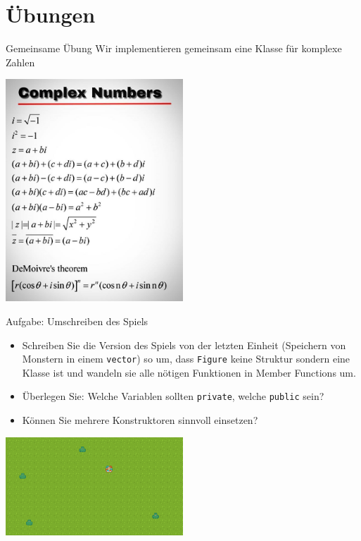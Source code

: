 \documentclass[presentation]{beamer}
\begin{document}
\section{Übungen}
\label{sec:org9ac32ae}
\begin{frame}[label={sec:orge5358c0}]{Gemeinsame Übung}
Wir implementieren gemeinsam eine \alert{Klasse für komplexe Zahlen}
\begin{center}\begin{center}
\includegraphics[width=0.5\textwidth]{complex_numbers.jpg}
\end{center}\end{center}
\end{frame}
\begin{frame}[fragile,label={sec:org19ffbb3}]{Aufgabe: Umschreiben des Spiels}
 \begin{itemize}
\item Schreiben Sie die Version des Spiels von der letzten Einheit
(Speichern von Monstern in einem {\color{solarizedYellow}\texttt{vector}}) so um, dass {\color{solarizedYellow}\texttt{Figure}}
keine Struktur sondern eine Klasse ist und wandeln sie alle nötigen
Funktionen in Member Functions um.
\item Überlegen Sie: Welche Variablen sollten {\color{solarizedYellow}\texttt{private}}, welche {\color{solarizedYellow}\texttt{public}}
sein?
\item Können Sie mehrere Konstruktoren sinnvoll einsetzen?
\end{itemize}
\begin{center}\begin{center}
\includegraphics[width=0.5\textwidth]{screenshot-20200406-225138.png}
\end{center}\end{center}
\end{frame}
\end{document}
